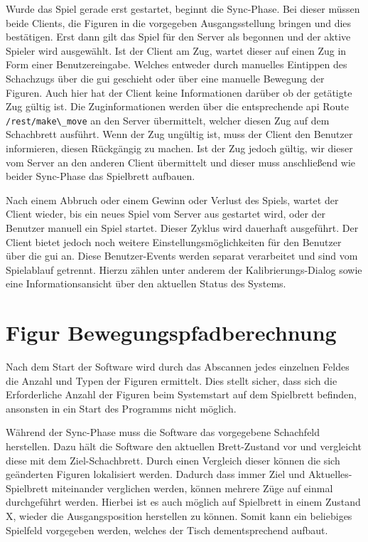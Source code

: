 Wurde das Spiel gerade erst gestartet, beginnt die Sync-Phase. Bei
dieser müssen beide Clients, die Figuren in die vorgegeben
Ausgangsstellung bringen und dies bestätigen. Erst dann gilt das Spiel
für den Server als begonnen und der aktive Spieler wird ausgewählt. Ist
der Client am Zug, wartet dieser auf einen Zug in Form einer
Benutzereingabe. Welches entweder durch manuelles Eintippen des
Schachzugs über die \gls{gui} geschieht oder über eine manuelle Bewegung
der Figuren. Auch hier hat der Client keine Informationen darüber ob der
getätigte Zug gültig ist. Die Zuginformationen werden über die
entsprechende \gls{api} Route \passthrough{\lstinline!/rest/make\_move!}
an den Server übermittelt, welcher diesen Zug auf dem Schachbrett
ausführt. Wenn der Zug ungültig ist, muss der Client den Benutzer
informieren, diesen Rückgängig zu machen. Ist der Zug jedoch gültig, wir
dieser vom Server an den anderen Client übermittelt und dieser muss
anschließend wie beider Sync-Phase das Spielbrett aufbauen.

Nach einem Abbruch oder einem Gewinn oder Verlust des Spiels, wartet der
Client wieder, bis ein neues Spiel vom Server aus gestartet wird, oder
der Benutzer manuell ein Spiel startet. Dieser Zyklus wird dauerhaft
ausgeführt. Der Client bietet jedoch noch weitere
Einstellungsmöglichkeiten für den Benutzer über die \gls{gui} an. Diese
Benutzer-Events werden separat verarbeitet und sind vom Spielablauf
getrennt. Hierzu zählen unter anderem der Kalibrierungs-Dialog sowie
eine Informationsansicht über den aktuellen Status des Systems.

\hypertarget{figur-bewegungspfadberechnung}{%
\section{Figur
Bewegungspfadberechnung}\label{figur-bewegungspfadberechnung}}

Nach dem Start der Software wird durch das Abscannen jedes einzelnen
Feldes die Anzahl und Typen der Figuren ermittelt. Dies stellt sicher,
dass sich die Erforderliche Anzahl der Figuren beim Systemstart auf dem
Spielbrett befinden, ansonsten in ein Start des Programms nicht möglich.

Während der Sync-Phase muss die Software das vorgegebene Schachfeld
herstellen. Dazu hält die Software den aktuellen Brett-Zustand vor und
vergleicht diese mit dem Ziel-Schachbrett. Durch einen Vergleich dieser
können die sich geänderten Figuren lokalisiert werden. Dadurch dass
immer Ziel und Aktuelles-Spielbrett miteinander verglichen werden,
können mehrere Züge auf einmal durchgeführt werden. Hierbei ist es auch
möglich auf Spielbrett in einem Zustand X, wieder die Ausgangsposition
herstellen zu können. Somit kann ein beliebiges Spielfeld vorgegeben
werden, welches der Tisch dementsprechend aufbaut.

